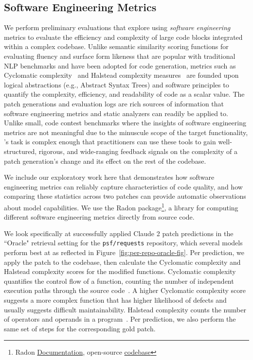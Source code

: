 

\subsection{Software Engineering Metrics}
We perform preliminary evaluations that explore using \textit{software engineering} metrics to evaluate the efficiency and complexity of large code blocks integrated within a complex codebase.
Unlike semantic similarity scoring functions for evaluating fluency and surface form likeness that are popular with traditional NLP benchmarks and have been adopted for code generation, metrics such as Cyclomatic complexity~\cite{mccabe1976complexity} and Halstead complexity measures~\cite{Halstead1977ElementsOS} are founded upon logical abstractions (e.g., Abstract Syntax Trees) and software principles to quantify the complexity, efficiency, and readability of code as a scalar value.
The patch generations and \benchmark{} evaluation logs are rich sources of information that software engineering metrics and static analyzers can readily be applied to.
Unlike small, code contest benchmarks where the insights of software engineering metrics are not meaningful due to the minuscule scope of the target functionality, \benchmark{}'s task is complex enough that practitioners can use these tools to gain well-structured, rigorous, and wide-ranging feedback signals on the complexity of a patch generation's change and its effect on the rest of the codebase.



We include our exploratory work here that demonstrates how software engineering metrics can reliably capture characteristics of code quality, and how comparing these statistics across two patches can provide automatic observations about model capabilities.
We use the Radon package\footnote{Radon \href{https://radon.readthedocs.io/en/latest/}{Documentation}, open-source \href{https://github.com/rubik/radon}{codebase}}, a library for computing different software engineering metrics directly from source code.

We look specifically at successfully applied Claude 2 patch predictions in the ``Oracle" retrieval setting for the \texttt{psf/requests} repository, which several models perform best at as reflected in Figure~\ref{fig:per-repo-oracle-fig}.
Per prediction, we apply the patch to the codebase, then calculate the Cyclomatic complexity and Halstead complexity scores for the modified functions.
Cyclomatic complexity quantifies the control flow of a function, counting the number of independent execution paths through the source code~\citep{mccabe1976complexity}.
A higher Cyclomatic complexity score suggests a more complex function that has higher likelihood of defects and usually suggests difficult maintainability.
Halstead complexity counts the number of operators and operands in a program~\citep{Halstead1977ElementsOS}.
Per prediction, we also perform the same set of steps for the corresponding gold patch.

